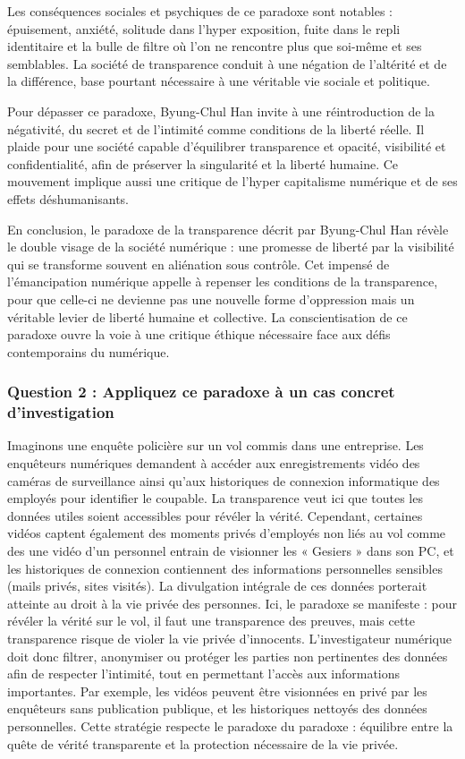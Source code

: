 \documentclass[12pt, a4paper]{article}
\begin{document}
	Les conséquences sociales et psychiques de ce paradoxe sont notables : épuisement, anxiété, solitude dans l'hyper exposition, fuite dans le repli identitaire et la bulle de filtre où l'on ne rencontre plus que soi-même et ses semblables. La société de transparence conduit à une négation de l'altérité et de la différence, base pourtant nécessaire à une véritable vie sociale et politique.
	
	Pour dépasser ce paradoxe, Byung-Chul Han invite à une réintroduction de la négativité, du secret et de l'intimité comme conditions de la liberté réelle. Il plaide pour une société capable d'équilibrer transparence et opacité, visibilité et confidentialité, afin de préserver la singularité et la liberté humaine. Ce mouvement implique aussi une critique de l'hyper capitalisme numérique et de ses effets déshumanisants.
	
	En conclusion, le paradoxe de la transparence décrit par Byung-Chul Han révèle le double visage de la société numérique : une promesse de liberté par la visibilité qui se transforme souvent en aliénation sous contrôle. Cet impensé de l'émancipation numérique appelle à repenser les conditions de la transparence, pour que celle-ci ne devienne pas une nouvelle forme d'oppression mais un véritable levier de liberté humaine et collective. La conscientisation de ce paradoxe ouvre la voie à une critique éthique nécessaire face aux défis contemporains du numérique.
	
	\subsubsection*{Question 2 : Appliquez ce paradoxe à un cas concret d'investigation}
	
	Imaginons une enquête policière sur un vol commis dans une entreprise. Les enquêteurs numériques demandent à accéder aux enregistrements vidéo des caméras de surveillance ainsi qu'aux historiques de connexion informatique des employés pour identifier le coupable. La transparence veut ici que toutes les données utiles soient accessibles pour révéler la vérité. Cependant, certaines vidéos captent également des moments privés d'employés non liés au vol comme des une vidéo d'un personnel entrain de visionner les « Gesiers » dans son PC, et les historiques de connexion contiennent des informations personnelles sensibles (mails privés, sites visités). La divulgation intégrale de ces données porterait atteinte au droit à la vie privée des personnes. Ici, le paradoxe se manifeste : pour révéler la vérité sur le vol, il faut une transparence des preuves, mais cette transparence risque de violer la vie privée d'innocents. L'investigateur numérique doit donc filtrer, anonymiser ou protéger les parties non pertinentes des données afin de respecter l'intimité, tout en permettant l'accès aux informations importantes. Par exemple, les vidéos peuvent être visionnées en privé par les enquêteurs sans publication publique, et les historiques nettoyés des données personnelles. Cette stratégie respecte le paradoxe du paradoxe : équilibre entre la quête de vérité transparente et la protection nécessaire de la vie privée.
	
\end{document}
